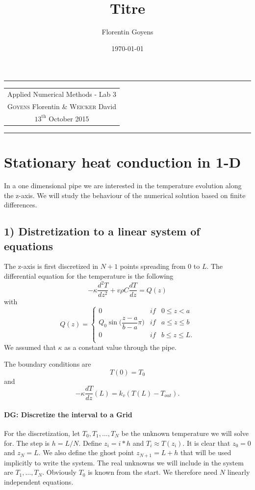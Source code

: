 \documentclass[11pt,a4paper]{report}
\title{Titre}
\author{Florentin Goyens}
\date{\today}
\begin{document}
\tabulinesep=1.2mm
\begin{center}
\hrule
\begin{tabular}{c}
\\[0.005cm]
\Large{Applied Numerical Methods - Lab 3}\\[0.3cm]
\textsc{Goyens} Florentin  \& \textsc{Weicker} David\\[0.2cm]
$\text{13}^{\text{th}}$ October 2015\\[0.2cm]
\end{tabular}
\hrule
\end{center}


\section*{Stationary heat conduction in 1-D}

In a one dimensional pipe we are interested in the temperature evolution along the z-axis.  We will study the behaviour of the numerical solution based on finite differences.



\subsection*{1) Distretization to a linear system of equations}

The z-axis is first discretized in $N+1$ points spreading from $0$ to $L$. The differential equation for the temperature is the following
$$-\kappa \dfrac{d^{2}T}{dz^{2}} +v\rho C\dfrac{dT}{dz}=Q(z)$$
with $$Q(z)= \left\{ \begin{array}{lll}
0 & if & 0\leq z <a\\
Q_{0}\sin \Big(\dfrac{z-a}{b-a}\pi \Big) & if & a \leq z \leq b\\
0 & if & b\leq z \leq L.\\
\end{array}\right.$$
We assumed that $\kappa$ as a constant value through the pipe.

The boundary conditions are
$$T(0)=T_{0}$$ and $$-\kappa \dfrac{dT}{dz}(L)=k_{v}(T(L)-T_{out}).$$

\paragraph*{DG: Discretize the interval to a Grid}

For the discretization, let $T_{0}, T_{1}, \dots, T_{N}$ be the unknown temperature we will solve for. The step is $h=L/N$. Define $z_{i}=i*h$ and $T_{i}\approx T(z_{i})$. It is clear that $z_0 =0$ and $z_N =L$. We also define the ghost point $z_{N+1}=L+h$ that will be used implicitly to write the system. The real unknowns we will include in the system are  $T_{1}, \dots, T_{N}$. Obviously $T_{0}$ is known from the start. We therefore need $N$ linearly independent equations.
\end{document}

